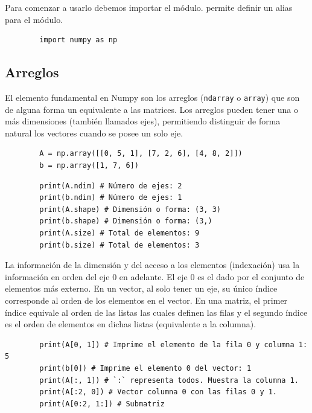 Para comenzar a usarlo debemos importar el módulo.  permite definir un alias para el módulo.

\begin{listing}[H]
    \begin{verbatim}
        import numpy as np
    \end{verbatim}
\end{listing}

\subsection{Arreglos}
El elemento fundamental en Numpy son los arreglos (\texttt{ndarray} o
\texttt{array}) que son de alguna forma un equivalente a las matrices.
Los arreglos pueden tener una o más dimensiones (también llamados ejes),
permitiendo distinguir de forma natural los vectores cuando se posee un
solo eje.

\begin{listing}[H]
    \begin{verbatim}
        A = np.array([[0, 5, 1], [7, 2, 6], [4, 8, 2]]) 
        b = np.array([1, 7, 6])
    \end{verbatim}
\end{listing}

\begin{listing}[H]
    \begin{verbatim}
        print(A.ndim) # Número de ejes: 2
        print(b.ndim) # Número de ejes: 1
        print(A.shape) # Dimensión o forma: (3, 3)
        print(b.shape) # Dimensión o forma: (3,)
        print(A.size) # Total de elementos: 9
        print(b.size) # Total de elementos: 3
    \end{verbatim}
\end{listing}

La información de la dimensión y del acceso a los elementos (indexación)
usa la información en orden del eje 0 en adelante. El eje 0 es el dado
por el conjunto de elementos más externo. En un vector, al solo tener un
eje, su único índice corresponde al orden de los elementos en el vector.
En una matriz, el primer índice equivale al orden de las listas las
cuales definen las filas y el segundo índice es el orden de elementos en
dichas listas (equivalente a la columna).

\begin{listing}[H]
    \begin{verbatim}
        print(A[0, 1]) # Imprime el elemento de la fila 0 y columna 1: 5
        print(b[0]) # Imprime el elemento 0 del vector: 1
        print(A[:, 1]) # `:` representa todos. Muestra la columna 1.
        print(A[:2, 0]) # Vector columna 0 con las filas 0 y 1.
        print(A[0:2, 1:]) # Submatriz
    \end{verbatim}
\end{listing}

